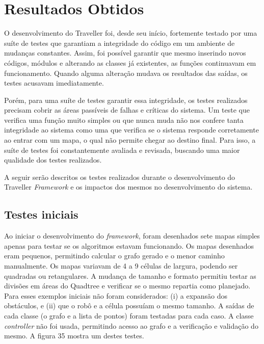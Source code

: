 \chapter[Resultados obtidos]{Resultados Obtidos}

O desenvolvimento do Traveller foi, desde seu início, fortemente testado por uma suíte de testes que garantiam a integridade do código em um ambiente de mudanças constantes. Assim, foi possível garantir que mesmo inserindo novos códigos, módulos e alterando as classes já existentes, as funções continuavam em funcionamento. Quando alguma alteração mudava os resultados das saídas, os testes acusavam imediatamente.

Porém, para uma suíte de testes garantir essa integridade, os testes realizados precisam cobrir as áreas passíveis de falhas e críticas do sistema. Um teste que verifica uma função muito simples ou que nunca muda não nos confere tanta integridade ao sistema como uma que verifica se o sistema responde corretamente ao entrar com um mapa, o qual não permite chegar ao destino final. Para isso, a suíte de testes foi constantemente avaliada e revisada, buscando uma maior qualidade dos testes realizados.

A seguir serão descritos os testes realizados durante o desenvolvimento do Traveller \textit{Framework} e os impactos dos mesmos no desenvolvimento do sistema.

\section{Testes iniciais}

Ao iniciar o desenvolvimento do \textit{framework}, foram desenhados sete mapas simples apenas para testar se os algoritmos estavam funcionando. Os mapas desenhados eram pequenos, permitindo calcular o grafo gerado e o menor caminho manualmente. Os mapas variavam  de 4 a 9 células de largura, podendo ser quadradas ou retangulares. A mudança de tamanho e formato permitiu testar as divisões em áreas do Quadtree e verificar se o mesmo repartia como planejado. Para esses exemplos iniciais não foram considerados: (i) a expansão dos obstáculos, e (ii) que o robô e a célula possuíam o mesmo tamanho. A saídas de cada classe (o grafo e a lista de pontos) foram testadas para cada caso. A classe \textit{controller} não foi usada, permitindo acesso ao grafo e a verificação e validação do mesmo. A figura 35 mostra um destes testes.

